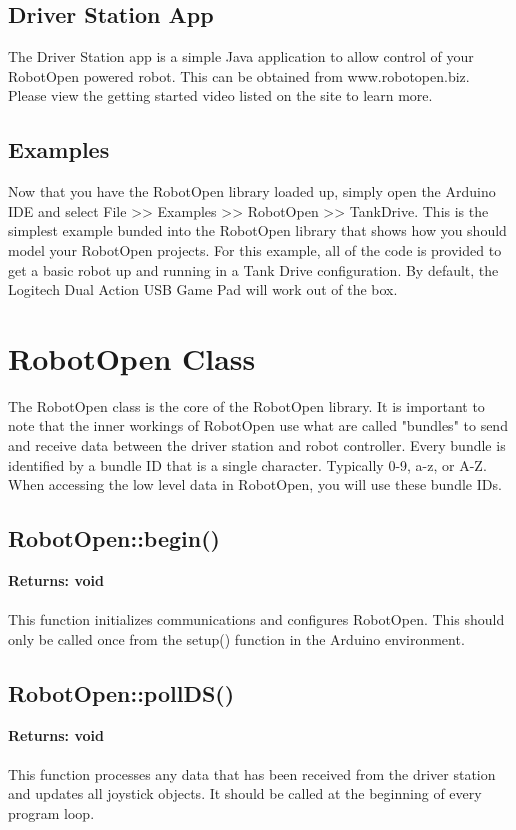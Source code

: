 \documentclass[11pt]{article} %
\begin{document}
\newpage

\subsection{Driver Station App}
The Driver Station app is a simple Java application to allow control of your RobotOpen powered robot. This can be obtained from www.robotopen.biz. Please view the getting started video listed on the site to learn more.

\subsection{Examples}
Now that you have the RobotOpen library loaded up, simply open the Arduino IDE and select File >> Examples >> RobotOpen >> TankDrive. This is the simplest example bunded into the RobotOpen library that shows how you should model your RobotOpen projects. For this example, all of the code is provided to get a basic robot up and running in a Tank Drive configuration. By default, the Logitech Dual Action USB Game Pad will work out of the box.

\newpage

\section{RobotOpen Class}

The RobotOpen class is the core of the RobotOpen library. It is important to note that the inner workings of RobotOpen use what are called "bundles" to send and receive data between the driver station and robot controller. Every bundle is identified by a bundle ID that is a single character. Typically 0-9, a-z, or A-Z. When accessing the low level data in RobotOpen, you will use these bundle IDs.

\subsection{RobotOpen::begin()}
\textbf{Returns: void}\\\\
This function initializes communications and configures RobotOpen. This should only be called once from the setup() function in the Arduino environment.
\subsection{RobotOpen::pollDS()}
\textbf{Returns: void}\\\\
This function processes any data that has been received from the driver station and updates all joystick objects. It should be called at the beginning of every program loop.
\end{document}

